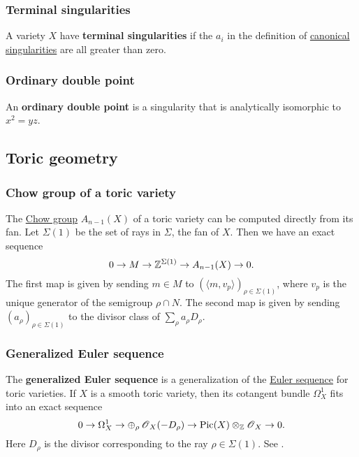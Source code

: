 \documentclass[11pt, english]{article}
\begin{document}
\subsubsection{Terminal singularities}
\label{terminalsings}

A variety $X$ have \textbf{terminal singularities} if the $a_i$ in the definition of \hyperref[canonicalsings]{canonical singularities} are all greater than zero.

\subsubsection{Ordinary double point}
\label{orddoublepoint}

An \textbf{ordinary double point} is a singularity that is analytically isomorphic to $x^2=yz$.

\subsection{Toric geometry}

\subsubsection{Chow group of a toric variety}
\label{chowtoric}

The \hyperref[chowgroup]{Chow group} $A_{n-1}(X)$ of a toric variety can be computed directly from its fan. Let $\Sigma(1)$ be the set of rays in $\Sigma$, the fan of $X$. Then we have an exact sequence
\[
 0 \to M \to \mathbb{Z}^{\Sigma(1)} \to A_{n-1}(X) \to 0.
\] 
The first map is given by sending $m \in M$ to $(\langle m,v_p \rangle )_{\rho \in \Sigma(1)}$, where $v_p$ is the unique generator of the semigroup $\rho \cap N$. The second map is given by sending $(a_\rho)_{\rho \in \Sigma(1)}$ to the divisor class of $\sum_\rho  a_\rho D_\rho$. 

\subsubsection{Generalized Euler sequence}
\label{toriceulerseq}

The \textbf{generalized Euler sequence} is a generalization of the \hyperref[eulersequence]{Euler sequence} for toric varieties. If $X$ is a smooth toric variety, then its cotangent bundle $\Omega_X^1$ fits into an exact sequence
\[
0 \to \Omega_X^1 \to \oplus_\rho \operatorname{\mathscr{O}}_X(-D_\rho) \to \operatorname{Pic}(X) \otimes_{\mathbb{Z}} \operatorname{\mathscr{O}}_X \to 0.
\]
Here $D_\rho$ is the divisor corresponding to the ray $\rho \in \Sigma(1)$. See \cite[Chapter 8]{cox_toric}. 
\end{document}
